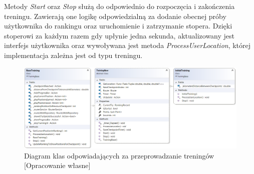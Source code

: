 Metody \textit{Start} oraz \textit{Stop} służą do odpowiednio do rozpoczęcia i zakończenia treningu. Zawierają one logikę odpowiedzialną za dodanie obecnej próby użytkownika do rankingu oraz uruchomienie i zatrzymanie stopera. Dzięki stoperowi za każdym razem gdy upłynie jedna sekunda, aktualizowany jest interfejs użytkownika oraz wywoływana jest metoda \textit{ProcessUserLocation}, której implementacja zależna jest od typu treningu.
\begin{figure}[h]\label{fig:asdl}
\begin{center}
\includegraphics[width=\textwidth]{img/trening-diagram.png}
\caption{Diagram klas odpowiadających za przeprowadzanie treningów [Opracowanie własne]}\label{image:trening-diagram}
\end{center}
\end{figure}
